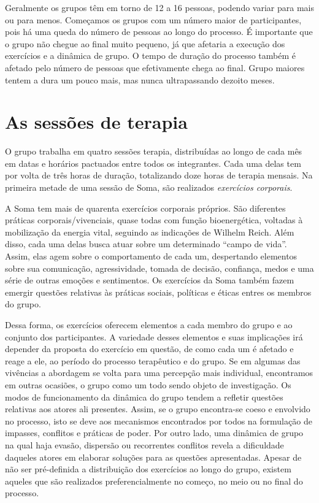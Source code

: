 Geralmente os grupos têm em torno de 12 a 16 pessoas, podendo variar
para mais ou para menos. Começamos os grupos com um número maior de
participantes, pois há uma queda do número de pessoas ao longo do
processo. É importante que o grupo não chegue ao final muito pequeno, já
que afetaria a execução dos exercícios e a dinâmica de grupo. O tempo de
duração do processo também é afetado pelo número de pessoas que
efetivamente chega ao final. Grupo maiores tentem a dura um pouco mais,
mas nunca ultrapassando dezoito meses.

\section{As sessões de terapia}

O grupo trabalha em quatro sessões terapia, distribuídas ao longo de
cada mês em datas e horários pactuados entre todos os integrantes. Cada
uma delas tem por volta de três horas de duração, totalizando doze horas
de terapia mensais. Na primeira metade de uma sessão de Soma, são
realizados \emph{exercícios corporais}.

A Soma tem mais de quarenta exercícios corporais próprios. São
diferentes práticas corporais/vivenciais, quase todas com função
bioenergética, voltadas à mobilização da energia vital, seguindo as
indicações de Wilhelm Reich. Além disso, cada uma delas busca atuar
sobre um determinado ``campo de vida''. Assim, elas agem sobre o
comportamento de cada um, despertando elementos sobre sua comunicação,
agressividade, tomada de decisão, confiança, medos e uma série de outras
emoções e sentimentos. Os exercícios da Soma também fazem emergir
questões relativas às práticas sociais, políticas e éticas entres os
membros do grupo.

Dessa forma, os exercícios oferecem elementos a cada membro do grupo e
ao conjunto dos participantes. A variedade desses elementos e suas
implicações irá depender da proposta do exercício em questão, de como
cada um é afetado e reage a ele, ao período do processo terapêutico e do
grupo. Se em algumas das vivências a abordagem se volta para uma
percepção mais individual, encontramos em outras ocasiões, o grupo como
um todo sendo objeto de investigação. Os modos de funcionamento da
dinâmica do grupo tendem a refletir questões relativas aos atores ali
presentes. Assim, se o grupo encontra-se coeso e envolvido no processo,
isto se deve aos mecanismos encontrados por todos na formulação de
impasses, conflitos e práticas de poder. Por outro lado, uma dinâmica de
grupo na qual haja evasão, dispersão ou recorrentes conflitos revela a
dificuldade daqueles atores em elaborar soluções para as questões
apresentadas. Apesar de não ser pré-definida a distribuição dos
exercícios ao longo do grupo, existem aqueles que são realizados
preferencialmente no começo, no meio ou no final do processo.

